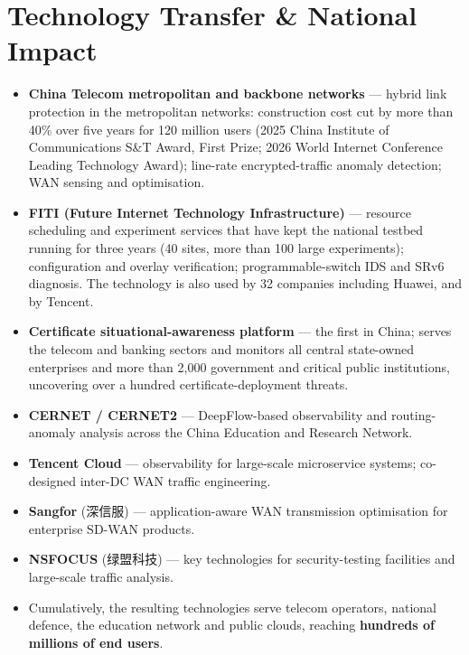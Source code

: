 \documentclass[11pt]{article}
\newcommand{\cn}[1]{#1}
\begin{document}
\section{Technology Transfer \& National Impact}
\begin{itemize}
  \item \textbf{China Telecom metropolitan and backbone networks} --- hybrid link
        protection in the metropolitan networks: construction cost cut by more than 40\%
        over five years for 120 million users (2025 China Institute of Communications
        S\&T Award, First Prize; 2026 World Internet Conference Leading Technology
        Award); line-rate encrypted-traffic anomaly detection; WAN sensing and
        optimisation.
  \item \textbf{FITI (Future Internet Technology Infrastructure)} --- resource scheduling
        and experiment services that have kept the national testbed running for three
        years (40 sites, more than 100 large experiments); configuration and overlay
        verification; programmable-switch IDS and SRv6 diagnosis. The technology is also
        used by 32 companies including Huawei, and by Tencent.
  \item \textbf{Certificate situational-awareness platform} --- the first in China;
        serves the telecom and banking sectors and monitors all central state-owned
        enterprises and more than 2{,}000 government and critical public institutions,
        uncovering over a hundred certificate-deployment threats.
  \item \textbf{CERNET / CERNET2} --- DeepFlow-based observability and routing-anomaly
        analysis across the China Education and Research Network.
  \item \textbf{Tencent Cloud} --- observability for large-scale microservice systems;
        co-designed inter-DC WAN traffic engineering.
  \item \textbf{Sangfor} (\cn{深信服}) --- application-aware WAN transmission
        optimisation for enterprise SD-WAN products.
  \item \textbf{NSFOCUS} (\cn{绿盟科技}) --- key technologies for security-testing
        facilities and large-scale traffic analysis.
  \item Cumulatively, the resulting technologies serve telecom operators, national
        defence, the education network and public clouds, reaching \textbf{hundreds of
        millions of end users}.
\end{itemize}
\end{document}
